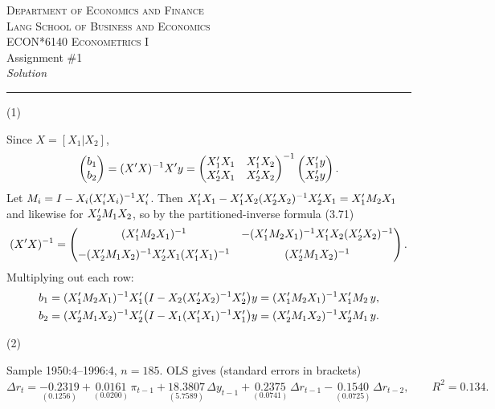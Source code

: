 \documentclass[11pt]{article}
\renewcommand{\question}[1]{\par\needspace{4\baselineskip}\medskip\noindent #1\par\nobreak\smallskip}
\begin{document}
\begin{center}
  {\footnotesize\scshape Department of Economics and Finance\\
   Lang School of Business and Economics}\\[5pt]
  {\large\scshape ECON*6140 Econometrics I}\\[3pt]
  {\LARGE Assignment \#1}\\[4pt]
  {\itshape Solution}
\end{center}
\vspace{0.4em}\hrule\vspace{0.9em}

\question{(1)}
Since $X = [X_{1}|X_{2}]$,
\[
  \begin{pmatrix} b_{1} \\ b_{2} \end{pmatrix}
  = (X^{\prime} X)^{-1}X^{\prime} y
  =
  \begin{pmatrix}
    X_{1}^{\prime} X_{1} & X_{1}^{\prime} X_{2} \\
    X_{2}^{\prime} X_{1} & X_{2}^{\prime} X_{2}
  \end{pmatrix}^{-1}
  \begin{pmatrix} X_{1}^{\prime} y \\ X_{2}^{\prime} y \end{pmatrix}.
\]
Let $M_{i} = I - X_{i}(X_{i}^{\prime} X_{i})^{-1}X_{i}^{\prime}$. Then
$X_{1}^{\prime} X_{1} - X_{1}^{\prime} X_{2}(X_{2}^{\prime} X_{2})^{-1}X_{2}^{\prime} X_{1} = X_{1}^{\prime} M_{2}X_{1}$
and likewise for $X_{2}^{\prime} M_{1}X_{2}$, so by the partitioned-inverse formula (3.71)
\[
  (X^{\prime} X)^{-1}
  =
  \begin{pmatrix}
    (X_{1}^{\prime} M_{2}X_{1})^{-1}
    & -(X_{1}^{\prime} M_{2}X_{1})^{-1}X_{1}^{\prime} X_{2}(X_{2}^{\prime} X_{2})^{-1} \\[6pt]
    -(X_{2}^{\prime} M_{1}X_{2})^{-1}X_{2}^{\prime} X_{1}(X_{1}^{\prime} X_{1})^{-1}
    & (X_{2}^{\prime} M_{1}X_{2})^{-1}
  \end{pmatrix}.
\]
Multiplying out each row:
\begin{align*}
  b_{1} &= (X_{1}^{\prime} M_{2}X_{1})^{-1}X_{1}^{\prime}\bigl(I - X_{2}(X_{2}^{\prime} X_{2})^{-1}X_{2}^{\prime}\bigr)y
         = (X_{1}^{\prime} M_{2}X_{1})^{-1}X_{1}^{\prime} M_{2}\,y, \\
  b_{2} &= (X_{2}^{\prime} M_{1}X_{2})^{-1}X_{2}^{\prime}\bigl(I - X_{1}(X_{1}^{\prime} X_{1})^{-1}X_{1}^{\prime}\bigr)y
         = (X_{2}^{\prime} M_{1}X_{2})^{-1}X_{2}^{\prime} M_{1}\,y.
\end{align*}

\question{(2)}
Sample 1950:4--1996:4, $n = 185$. OLS gives (standard errors in brackets)
\[
  \widehat{\Delta r}_{t} = \underset{(0.1256)}{-0.2319}
  + \underset{(0.0200)}{0.0161}\,\pi_{t-1}
  + \underset{(5.7589)}{18.3807}\,\Delta y_{t-1}
  + \underset{(0.0741)}{0.2375}\,\Delta r_{t-1}
  - \underset{(0.0725)}{0.1540}\,\Delta r_{t-2},
  \qquad R^{2} = 0.134.
\]
\end{document}
